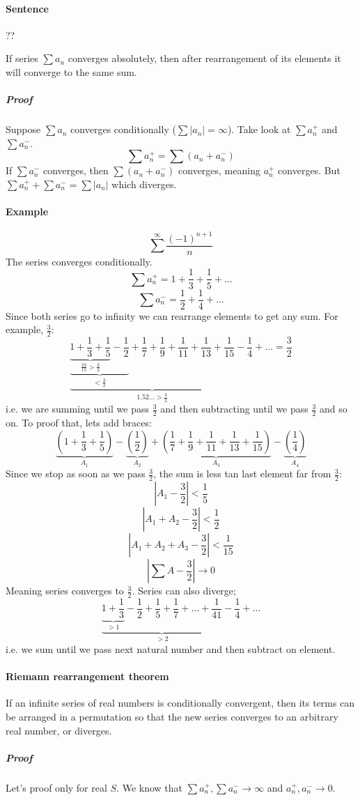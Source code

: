 \paragraph{Sentence}
??

If series $\sum a_n$ converges absolutely, then after rearrangement  of its elements it will converge to the same sum.
\subparagraph{Proof}
Suppose $\sum a_n$ converges conditionally ($\sum |a_n| = \infty$). Take look at $\sum a_n^+$ and $\sum a_n^-$.
$$\sum a_n^+ = \sum (a_n + a_n^-)$$
If $\sum a_n^-$ converges, then $\sum(a_n+a_n^-)$ converges, meaning $a_n^+$ converges. But $\sum a_n^+ + \sum a_n^- = \sum |a_n|$ which diverges.
\paragraph{Example}
$$\sum^\infty \frac{(-1)^{n+1}}{n}$$
The series converges  conditionally.
$$\sum a_n^+ = 1+\frac{1}{3} + \frac{1}{5} + \dots$$
$$\sum a_n^- = \frac{1}{2} + \frac{1}{4} + \dots$$
Since both series go to infinity we can rearrange elements to get any sum. For example, $\frac{3}{2}$:
$$\underbrace{\underbrace{\underbrace{1+\frac{1}{3}+\frac{1}{5}}_{\frac{23}{15}>\frac{3}{2}}-\frac{1}{2}}_{<\frac{3}{2}}+\frac{1}{7}+\frac{1}{9}+\frac{1}{11}+\frac{1}{13}+\frac{1}{15}}_{1.52\dots>\frac{3}{2}}-\frac{1}{4}+\dots = \frac{3}{2}$$
i.e. we are summing until we pass $\frac{3}{2}$ and then subtracting until we pass $\frac{3}{2}$ and so on. To proof that, lets add braces:
$$\underbrace{\left(1+\frac{1}{3}+\frac{1}{5}\right)}_{A_1}-\underbrace{\left(\frac{1}{2}\right)}_{A_2}+\underbrace{\left(\frac{1}{7}+\frac{1}{9}+\frac{1}{11}+\frac{1}{13}+\frac{1}{15}\right)}_{A_3}-\underbrace{\left(\frac{1}{4}\right)}_{A_4}$$
Since we stop as soon as we pass $\frac{3}{2}$, the sum is less tan last element far from $\frac{3}{2}$:
$$\left|A_1-\frac{3}{2}\right|<\frac{1}{5}$$
$$\left|A_1+A_2-\frac{3}{2}\right|<\frac{1}{2}$$
$$\left|A_1+A_2+A_3-\frac{3}{2}\right|<\frac{1}{15}$$
$$\left|\sum A-\frac{3}{2}\right| \to 0$$
Meaning series converges to $\frac{3}{2}$.
Series can also diverge;
$$\underbrace{\underbrace{1+\frac{1}{3}}_{>1}-\frac{1}{2}+\frac{1}{5}+\frac{1}{7} + \dots + \frac{1}{41}}_{>2} - \frac{1}{4} + \dots$$
i.e. we sum until we pass next natural number and then subtract on element.
\paragraph{Riemann rearrangement theorem}  If an infinite series of real numbers is conditionally convergent, then its terms can be arranged in a permutation so that the new series converges to an arbitrary real number, or diverges.
\subparagraph{Proof}
Let's proof only for real $S$. We know that $\sum a_n^+, \sum a_n^- \to \infty$ and $a_n^+, a_n^- \to 0$.

